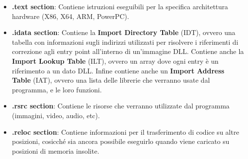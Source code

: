 \documentclass{article}
\begin{document}
\begin{itemize}
    \item \textbf{.text section}: Contiene istruzioni eseguibili per la specifica architettura hardware (X86, X64, ARM, PowerPC).   

    \item \textbf{.idata section}: Contiene la \textbf{Import Directory Table} (IDT), ovvero una tabella con informazioni sugli indirizzi utilizzati per risolvere i riferimenti di correzione agli entry point all'interno di un'immagine DLL. Contiene anche la \textbf{Import Lookup Table} (ILT), ovvero un array dove ogni entry è un riferimento a un dato DLL.
    Infine contiene anche un \textbf{Import Address Table} (IAT), ovvero 
    una lista delle librerie che verranno usate dal programma, e le loro funzioni.

    \item \textbf{.rsrc section}: Contiene le risorse che verranno utilizzate dal programma (immagini, video, audio, etc).

    \item \textbf{.reloc section}: Contiene informazioni per il trasferimento di codice su altre posizioni, cosicché sia ancora possibile eseguirlo quando viene caricato su posizioni di memoria insolite.
\end{itemize}
\end{document}
